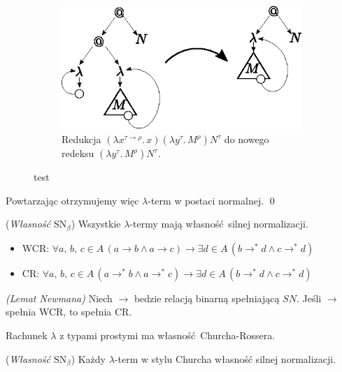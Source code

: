 \begin{dowod}
\begin{figure}[htb]
\end{figure}
\begin{figure}[htb]\ContinuedFloat
  \centering
  \begin{subfigure}{0.55\textwidth}
    \includegraphics[width=1\linewidth]{../reduction3}
    \caption{Redukcja \((\lambda x^{\tau\to\rho}.\,x)(\lambda y^\tau.\,M^\rho) N^\tau\) do nowego redeksu \((\lambda y^\tau.\,M^\rho)N^\tau\).}
  \end{subfigure}
  \caption{test}
\end{figure}
\clearpage 

  Powtarzając otrzymujemy więc \(\lambda\)-term w postaci normalnej. \qed

\end{dowod}
\begin{twierdzenie} 
  (\emph{Własność \(\mathrm{SN}_{\beta}\)}) Wszystkie \(\lambda\)-termy mają własność silnej normalizacji.
\end{twierdzenie}
\begin{itemize}
\item WCR: \(\forall a,\,b,\,c\in A\, (a\longrightarrow b \land a\longrightarrow c)\to \exists d\in A\,(b\longrightarrow^{*} d \land c\longrightarrow^{*} d)\)
\item CR: \(\forall a,\,b,\,c\in A\, (a\longrightarrow^{*} b \land a\longrightarrow^{*}c)\to \exists d\in A\,(b\longrightarrow^{*} d \land c\longrightarrow^{*} d)\)
\end{itemize}
\begin{twierdzenie} 
  \emph{(Lemat Newmana)} Niech \(\to\) bedzie relacją binarną spełniającą \(SN\). Jeśli \(\to\) spełnia WCR, to spełnia CR.
\end{twierdzenie}
\begin{dowod}
\end{dowod}

\begin{twierdzenie}\label{thm:church-rosser}
  Rachunek \(\lambda\) z typami prostymi ma własność Churcha-Rossera.
\end{twierdzenie}

\begin{twierdzenie} 
  (\emph{Własność \(\mathrm{SN}_{\beta}\)}) Każdy \(\lambda\)-term w stylu Churcha własność silnej normalizacji.
\end{twierdzenie}
\begin{dowod}
\end{dowod}

